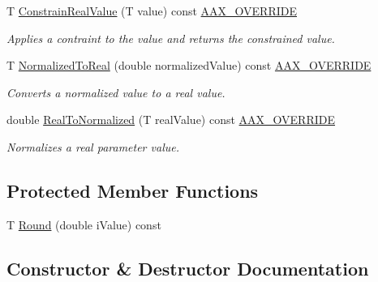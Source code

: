 \begin{DoxyCompactItemize}
T \mbox{\hyperlink{a01553_ac9d5c430c625bb3e9720d009a1b9d779}{Constrain\+Real\+Value}} (T value) const \mbox{\hyperlink{a00392_ac2f24a5172689ae684344abdcce55463}{A\+A\+X\+\_\+\+O\+V\+E\+R\+R\+I\+DE}}
\begin{DoxyCompactList}\small\item\em Applies a contraint to the value and returns the constrained value. \end{DoxyCompactList}\item 
T \mbox{\hyperlink{a01553_aa95b3b0312bb861f20aa91888ba051bf}{Normalized\+To\+Real}} (double normalized\+Value) const \mbox{\hyperlink{a00392_ac2f24a5172689ae684344abdcce55463}{A\+A\+X\+\_\+\+O\+V\+E\+R\+R\+I\+DE}}
\begin{DoxyCompactList}\small\item\em Converts a normalized value to a real value. \end{DoxyCompactList}\item 
double \mbox{\hyperlink{a01553_a5882df4a8f80ca2a88b512e87e7b36bc}{Real\+To\+Normalized}} (T real\+Value) const \mbox{\hyperlink{a00392_ac2f24a5172689ae684344abdcce55463}{A\+A\+X\+\_\+\+O\+V\+E\+R\+R\+I\+DE}}
\begin{DoxyCompactList}\small\item\em Normalizes a real parameter value. \end{DoxyCompactList}\end{DoxyCompactItemize}
\subsection*{Protected Member Functions}
\begin{DoxyCompactItemize}
\item 
T \mbox{\hyperlink{a01553_a6ec8cca43a67762239bb3bc123f4a7f5}{Round}} (double i\+Value) const
\end{DoxyCompactItemize}


\subsection{Constructor \& Destructor Documentation}
\mbox{\label{a01553_a265a1e6a8f81a1ad8e1aad7ebfceb480}} 
